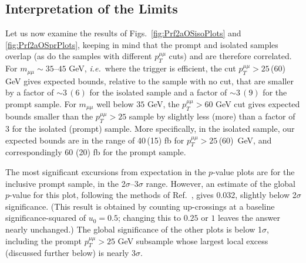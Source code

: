 \documentclass[aps,prd,twocolumn,superscriptaddress,preprintnumbers,nofootinbib,longbibliography,floatfix]{revtex4-1}
\newcommand{\ptmm}{p_T^{\mu\mu}}
\DeclareRobustCommand{\Figs}[2]{Figs.~\ref{#1} and \ref{#2}}
\DeclareRobustCommand{\Ref}[1]{Ref.~\cite{#1}}
\begin{document}
\subsection{Interpretation of the Limits}


Let us now examine the results of \Figs{fig:Prf2aOSisoPlots}{fig:Prf2aOSprPlots}, keeping in mind that the prompt and isolated samples overlap (as do the samples with different $\ptmm$ cuts) and are therefore correlated.
%
For $m_{\mu\mu}\sim 35$--$45$ GeV, {\it i.e.}\ where the trigger is efficient, the cut $\ptmm> 25$\,(60) GeV gives expected bounds, relative to the sample with no cut, that are smaller by a factor of $\sim 3\,(6)$ for the isolated sample and a factor of $\sim 3\,(9)$ for the prompt sample.
%  
For $m_{\mu\mu}$ well below $35$ GeV, the $\ptmm> 60$ GeV cut gives expected bounds smaller than the $\ptmm> 25$ sample by slightly less (more) than a factor of $3$ for the isolated (prompt) sample.
%
More specifically, in the isolated sample, our expected bounds are in the range of 40\,(15) fb for $\ptmm> 25$\,(60)~GeV, and correspondingly 60 (20) fb for the prompt sample.

The most significant excursions from expectation in the $p$-value plots are for the inclusive prompt sample, in the 2$\sigma$--3$\sigma$ range.
%
However, an estimate of the global $p$-value for this plot, following the methods of \Ref{Gross:2010qma}, gives 0.032, slightly below 2$\sigma$ significance.
%
(This result is obtained by counting up-crossings at a baseline significance-squared of $u_0=0.5$; changing this to $0.25$ or $1$ leaves the answer nearly unchanged.)
%
The  global significance of the other plots is  below 1$\sigma$, including the prompt $\ptmm>25$ GeV subsample whose largest local excess (discussed further below) is nearly 3$\sigma$.
%
\end{document}
